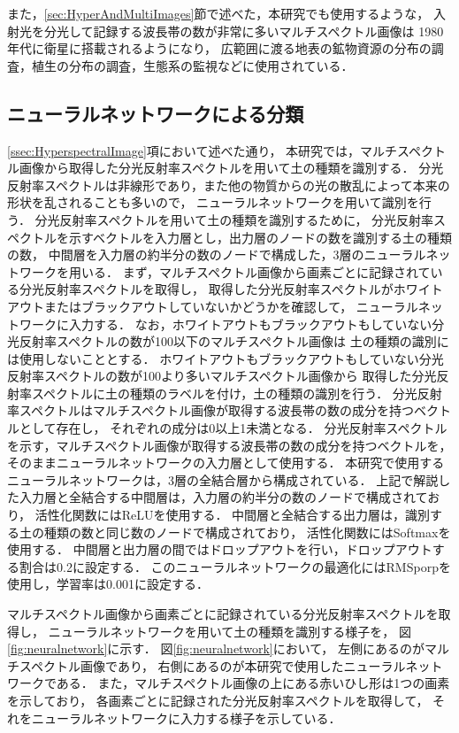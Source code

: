 また，\ref{sec:HyperAndMultiImages}節で述べた，本研究でも使用するような，
入射光を分光して記録する波長帯の数が非常に多いマルチスペクトル画像は
1980年代に衛星に搭載されるようになり，
広範囲に渡る地表の鉱物資源の分布の調査，植生の分布の調査，生態系の監視などに使用されている\cite{Underwood2003}\cite{Kruse2003}\cite{Ustin2004}\cite{Haboudane2004}\cite{Clark2005}．

\clearpage

\subsection{ニューラルネットワークによる分類}
\label{ssec:NeuralNetWork}

\ref{ssec:HyperspectralImage}項において述べた通り，
本研究では，マルチスペクトル画像から取得した分光反射率スペクトルを用いて土の種類を識別する．
分光反射率スペクトルは非線形であり，また他の物質からの光の散乱によって本来の形状を乱されることも多いので，
ニューラルネットワークを用いて識別を行う．
分光反射率スペクトルを用いて土の種類を識別するために，
分光反射率スペクトルを示すベクトルを入力層とし，出力層のノードの数を識別する土の種類の数，
中間層を入力層の約半分の数のノードで構成した，3層のニューラルネットワークを用いる．
まず，マルチスペクトル画像から画素ごとに記録されている分光反射率スペクトルを取得し，
取得した分光反射率スペクトルがホワイトアウトまたはブラックアウトしていないかどうかを確認して，
ニューラルネットワークに入力する．
なお，ホワイトアウトもブラックアウトもしていない分光反射率スペクトルの数が100以下のマルチスペクトル画像は
土の種類の識別には使用しないこととする．
ホワイトアウトもブラックアウトもしていない分光反射率スペクトルの数が100より多いマルチスペクトル画像から
取得した分光反射率スペクトルに土の種類のラベルを付け，土の種類の識別を行う．
分光反射率スペクトルはマルチスペクトル画像が取得する波長帯の数の成分を持つベクトルとして存在し，
それぞれの成分は0以上1未満となる．
分光反射率スペクトルを示す，マルチスペクトル画像が取得する波長帯の数の成分を持つベクトルを，
そのままニューラルネットワークの入力層として使用する．
本研究で使用するニューラルネットワークは，3層の全結合層から構成されている．
上記で解説した入力層と全結合する中間層は，入力層の約半分の数のノードで構成されており，
活性化関数にはReLUを使用する．
中間層と全結合する出力層は，識別する土の種類の数と同じ数のノードで構成されており，
活性化関数にはSoftmaxを使用する．
中間層と出力層の間ではドロップアウトを行い，ドロップアウトする割合は0.2に設定する．
このニューラルネットワークの最適化にはRMSporpを使用し，学習率は0.001に設定する．

マルチスペクトル画像から画素ごとに記録されている分光反射率スペクトルを取得し，
ニューラルネットワークを用いて土の種類を識別する様子を，
図\ref{fig:neuralnetwork}に示す．
図\ref{fig:neuralnetwork}において，
左側にあるのがマルチスペクトル画像であり，
右側にあるのが本研究で使用したニューラルネットワークである．
また，マルチスペクトル画像の上にある赤いひし形は1つの画素を示しており，
各画素ごとに記録された分光反射率スペクトルを取得して，
それをニューラルネットワークに入力する様子を示している．

